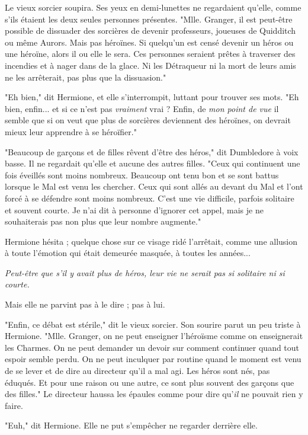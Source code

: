 Le vieux sorcier soupira. Ses yeux en demi-lunettes ne regardaient qu'elle, comme s'ils étaient les deux seules personnes présentes. "Mlle. Granger, il est peut-être possible de dissuader des sorcières de devenir professeurs, joueuses de Quidditch ou même Aurors. Mais pas héroïnes. Si quelqu'un est censé devenir un héros ou une héroïne, alors il ou elle le sera. Ces personnes seraient prêtes à traverser des incendies et à nager dans de la glace. Ni les Détraqueur ni la mort de leurs amis ne les arrêterait, pas plus que la dissuasion."

"Eh bien," dit Hermione, et elle s'interrompit, luttant pour trouver ses mots. "Eh bien, enfin... et si ce n'est pas \emph{vraiment}  vrai ? Enfin, de \emph{mon point de vue}  il semble que si on veut que plus de sorcières deviennent des héroïnes, on devrait mieux leur apprendre à se héroïfier."

"Beaucoup de garçons et de filles rêvent d'être des héros," dit Dumbledore à voix basse. Il ne regardait qu'elle et aucune des autres filles. "Ceux qui continuent une fois éveillés sont moins nombreux. Beaucoup ont tenu bon et se sont battus lorsque le Mal est venu les chercher. Ceux qui sont allés au devant du Mal et l'ont forcé à se défendre sont moins nombreux. C'est une vie difficile, parfois solitaire et souvent courte. Je n'ai dit à personne d'ignorer cet appel, mais je ne souhaiterais pas non plus que leur nombre augmente."

Hermione hésita ; quelque chose sur ce visage ridé l'arrêtait, comme une allusion à toute l'émotion qui était demeurée masquée, à toutes les années...

\emph{Peut-être que s'il y avait plus de héros, leur vie ne serait pas si solitaire ni si courte.} 

Mais elle ne parvint pas à le dire ; pas à lui.

"Enfin, ce débat est stérile," dit le vieux sorcier. Son sourire parut un peu triste à Hermione. "Mlle. Granger, on ne peut enseigner l'héroïsme comme on enseignerait les Charmes. On ne peut demander un devoir sur comment continuer quand tout espoir semble perdu. On ne peut inculquer par routine quand le moment est venu de se lever et de dire au directeur qu'il a mal agi. Les héros sont nés, pas éduqués. Et pour une raison ou une autre, ce sont plus souvent des garçons que des filles." Le directeur haussa les épaules comme pour dire qu'\emph{il}  ne pouvait rien y faire.

"Euh," dit Hermione. Elle ne put s'empêcher ne regarder derrière elle.

